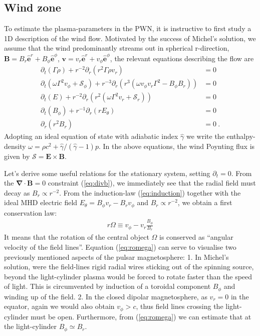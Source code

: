 \subsection{Wind zone}

To estimate the plasma-parameters in the PWN, it is instructive to first study a 1D description of the wind flow.  
Motivated by the success of Michel's solution, we assume that the wind predominantly streams out in spherical r-direction, $\mathbf{B}=B_r\mathbf{\hat{e}}^r+B_\phi\mathbf{\hat{e}}^\phi$, $\mathbf{v}=v_r\mathbf{\hat{e}}^r+v_\phi\mathbf{\hat{e}}^\phi$, the relevant equations describing the flow are
%
\begin{align}
  \partial_t(\Gamma \rho) + r^{-2} \partial_r(r^2\Gamma \rho v_r) &= 0 \label{eq:continuity} \\
  \partial_t(\omega \Gamma^2 v_\phi + \mathcal{S}_\phi) + r^{-3}\partial_r(r^3(\omega v_\phi v_r \Gamma^2-B_\phi B_r)) &= 0 \label{eq:mphi}\\
  \partial_t(E) + r^{-2}\partial_r(r^2 (\omega \Gamma^2 v_r + \mathcal{S}_r)) &= 0 \label{eq:energy} \\
  \partial_t(B_\phi) + r^{-1}\partial_r(r E_\theta) &= 0 \label{eq:induction} \\
  \partial_r(r^2 B_r) &= 0 \label{eq:divb}\ .
\end{align}
%
Adopting an ideal equation of state with adiabatic index $\hat{\gamma}$ we write the enthalpy-density $\omega=\rho c^2+\hat{\gamma}/(\hat{\gamma}-1) p $.  In the above equations, the wind Poynting flux is given by $\mathbf{\mathcal{S}} = \mathbf{E \times B}$.

Let's derive some useful relations for the stationary system, setting $\partial_t=0$.
From the $\mathbf{\nabla\cdot B}=0$ constraint (\ref{eq:divb}), we immediately see that the radial field must decay as $B_r\propto r^{-2}$.    From the induction-law (\ref{eq:induction}) together with the ideal MHD electric field $E_\theta=B_\phi v_r-B_r v_\phi$ and $B_r\propto r^{-2}$, we obtain a first conservation law:
\begin{align}
  r\Omega \equiv v_\phi - v_r \frac{B_\phi}{B_r} \label{eq:romega}
\end{align}
It means that the rotation of the central object  $\Omega$  is conserved as ``angular velocity of the field lines''.  
Equation (\ref{eq:romega}) can serve to visualise two previously mentioned aspects of the pulsar magnetosphere:  1. In Michel's solution, were the field-lines rigid radial wires sticking out of the spinning source, beyond the light-cylinder plasma would be forced to rotate faster than the speed of light.  This is circumvented by induction of a toroidal component $B_\phi$ and winding up of the field.  2. In the closed dipolar magnetosphere, as $v_r=0$ in the equator, again we would also obtain $v_\phi>c$, thus field lines crossing the light-cylinder must be open.  
Furthermore, from (\ref{eq:romega}) we can estimate that at the light-cylinder $B_\phi\simeq B_r$.  

